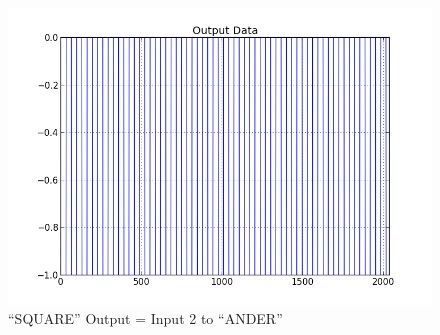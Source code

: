         \begin{figure}[h]
                \centering
                \includegraphics[scale=0.5]{./figures/square_pulse.jpg}
                \caption{``SQUARE'' Output = Input 2 to ``ANDER''}
                \label{fig:square_pulse}
        \end{figure}



